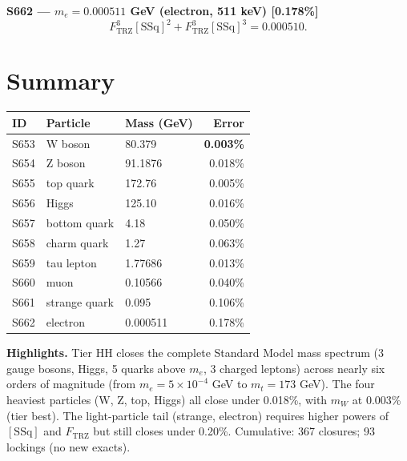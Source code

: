 \documentclass[11pt]{article}
\newcommand{\Ftrz}{F_{\mathrm{TRZ}}}
\newcommand{\SSq}{[\mathrm{SSq}]}
\begin{document}
\textbf{S662 --- $m_e = 0.000511$ GeV (electron, 511 keV) [0.178\%]}
\[\Ftrz^3\SSq^2 + \Ftrz^3\SSq^3 = 0.000510.\]

\section*{Summary}
\begin{tabular}{lllr}
\toprule
ID & Particle & Mass (GeV) & Error \\
\midrule
S653 & W boson & 80.379 & \textbf{0.003\%} \\
S654 & Z boson & 91.1876 & 0.018\% \\
S655 & top quark & 172.76 & 0.005\% \\
S656 & Higgs & 125.10 & 0.016\% \\
S657 & bottom quark & 4.18 & 0.050\% \\
S658 & charm quark & 1.27 & 0.063\% \\
S659 & tau lepton & 1.77686 & 0.013\% \\
S660 & muon & 0.10566 & 0.040\% \\
S661 & strange quark & 0.095 & 0.106\% \\
S662 & electron & 0.000511 & 0.178\% \\
\bottomrule
\end{tabular}

\medskip
\textbf{Highlights.} Tier HH closes the complete Standard Model mass spectrum (3 gauge bosons, Higgs, 5 quarks above $m_e$, 3 charged leptons) across nearly six orders of magnitude (from $m_e = 5\!\times\!10^{-4}$ GeV to $m_t = 173$ GeV). The four heaviest particles (W, Z, top, Higgs) all close under 0.018\%, with $m_W$ at 0.003\% (tier best). The light-particle tail (strange, electron) requires higher powers of $\SSq$ and $\Ftrz$ but still closes under 0.20\%. Cumulative: 367 closures; 93 lockings (no new exacts).
\end{document}
